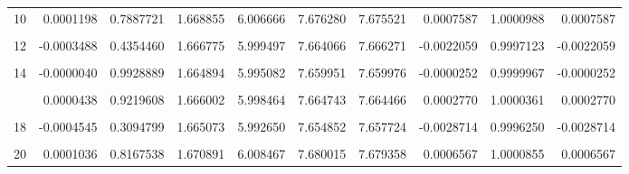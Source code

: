 \documentclass[a4paper]{tufte-handout}
\begin{document}
\begin{table}
{\begin{tabular}[t]{rrrrrrrrrr}
10 & 0.0001198 & 0.7887721 & 1.668855 & 6.006666 & 7.676280 & 7.675521 & 0.0007587 & 1.0000988 & 0.0007587\\
\addlinespace
\cellcolor{gray!6}{11} & \cellcolor{gray!6}{0.0002645} & \cellcolor{gray!6}{0.5542274} & \cellcolor{gray!6}{1.668434} & \cellcolor{gray!6}{6.004580} & \cellcolor{gray!6}{7.674688} & \cellcolor{gray!6}{7.673014} & \cellcolor{gray!6}{0.0016744} & \cellcolor{gray!6}{1.0002182} & \cellcolor{gray!6}{0.0016744}\\
12 & -0.0003488 & 0.4354460 & 1.666775 & 5.999497 & 7.664066 & 7.666271 & -0.0022059 & 0.9997123 & -0.0022059\\
\cellcolor{gray!6}{13} & \cellcolor{gray!6}{0.0007602} & \cellcolor{gray!6}{0.0891628} & \cellcolor{gray!6}{1.663094} & \cellcolor{gray!6}{6.006085} & \cellcolor{gray!6}{7.673984} & \cellcolor{gray!6}{7.669179} & \cellcolor{gray!6}{0.0048051} & \cellcolor{gray!6}{1.0006266} & \cellcolor{gray!6}{0.0048051}\\
14 & -0.0000040 & 0.9928889 & 1.664894 & 5.995082 & 7.659951 & 7.659976 & -0.0000252 & 0.9999967 & -0.0000252\\
\cellcolor{gray!6}{15} & \cellcolor{gray!6}{0.0005534} & \cellcolor{gray!6}{0.2159302} & \cellcolor{gray!6}{1.669772} & \cellcolor{gray!6}{6.003873} & \cellcolor{gray!6}{7.677149} & \cellcolor{gray!6}{7.673645} & \cellcolor{gray!6}{0.0035043} & \cellcolor{gray!6}{1.0004567} & \cellcolor{gray!6}{0.0035043}\\
\addlinespace
16 & 0.0000438 & 0.9219608 & 1.666002 & 5.998464 & 7.664743 & 7.664466 & 0.0002770 & 1.0000361 & 0.0002770\\
\cellcolor{gray!6}{17} & \cellcolor{gray!6}{0.0002501} & \cellcolor{gray!6}{0.5760000} & \cellcolor{gray!6}{1.665924} & \cellcolor{gray!6}{6.003260} & \cellcolor{gray!6}{7.670766} & \cellcolor{gray!6}{7.669184} & \cellcolor{gray!6}{0.0015818} & \cellcolor{gray!6}{1.0002063} & \cellcolor{gray!6}{0.0015818}\\
18 & -0.0004545 & 0.3094799 & 1.665073 & 5.992650 & 7.654852 & 7.657724 & -0.0028714 & 0.9996250 & -0.0028714\\
\cellcolor{gray!6}{19} & \cellcolor{gray!6}{-0.0002343} & \cellcolor{gray!6}{0.6003523} & \cellcolor{gray!6}{1.664831} & \cellcolor{gray!6}{6.006462} & \cellcolor{gray!6}{7.669810} & \cellcolor{gray!6}{7.671292} & \cellcolor{gray!6}{-0.0014818} & \cellcolor{gray!6}{0.9998068} & \cellcolor{gray!6}{-0.0014818}\\
20 & 0.0001036 & 0.8167538 & 1.670891 & 6.008467 & 7.680015 & 7.679358 & 0.0006567 & 1.0000855 & 0.0006567\\
\bottomrule
\end{tabular}}
\end{table}


\end{document}
